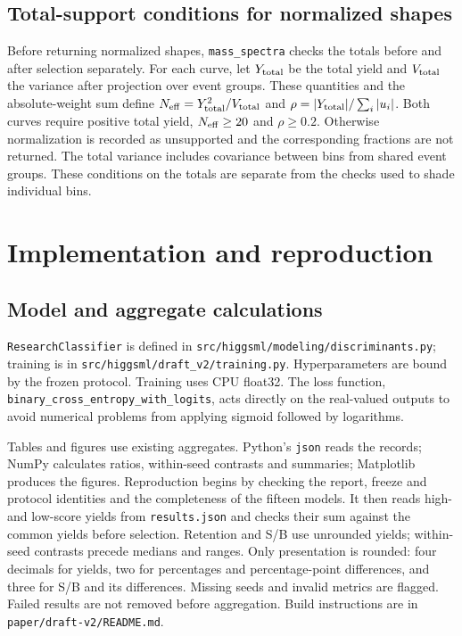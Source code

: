 \documentclass[11pt,a4paper]{article}
\begin{document}
\subsection{Total-support conditions for normalized shapes}\label{app:shape-support}
Before returning normalized shapes, \texttt{mass\_spectra} checks the totals before and after selection separately.
For each curve, let $Y_{\rm total}$ be the total yield and $V_{\rm total}$ the variance after projection over event groups. These quantities and the absolute-weight sum define $N_{\rm eff}=Y_{\rm total}^2/V_{\rm total}$ and $\rho=|Y_{\rm total}|/\sum_i|u_i|$.
Both curves require positive total yield, $N_{\rm eff}\geq20$ and $\rho\geq0.2$.
Otherwise normalization is recorded as unsupported and the corresponding fractions are not returned.
The total variance includes covariance between bins from shared event groups. These conditions on the totals are separate from the checks used to shade individual bins.

\section{Implementation and reproduction}\label{app:network}

\subsection{Model and aggregate calculations}
\texttt{ResearchClassifier} is defined in \nolinkurl{src/higgsml/modeling/discriminants.py}; training is in \nolinkurl{src/higgsml/draft_v2/training.py}.
Hyperparameters are bound by the frozen protocol.
Training uses CPU float32. The loss function, \texttt{binary\_cross\_entropy\_with\_logits}, acts directly on the real-valued outputs to avoid numerical problems from applying sigmoid followed by logarithms.

Tables and figures use existing aggregates. Python's \texttt{json} reads the records; NumPy calculates ratios, within-seed contrasts and summaries; Matplotlib produces the figures.
Reproduction begins by checking the report, freeze and protocol identities and the completeness of the fifteen models. It then reads high- and low-score yields from \texttt{results.json} and checks their sum against the common yields before selection.
Retention and S/B use unrounded yields; within-seed contrasts precede medians and ranges.
Only presentation is rounded: four decimals for yields, two for percentages and percentage-point differences, and three for S/B and its differences.
Missing seeds and invalid metrics are flagged. Failed results are not removed before aggregation.
Build instructions are in \nolinkurl{paper/draft-v2/README.md}.
\end{document}
